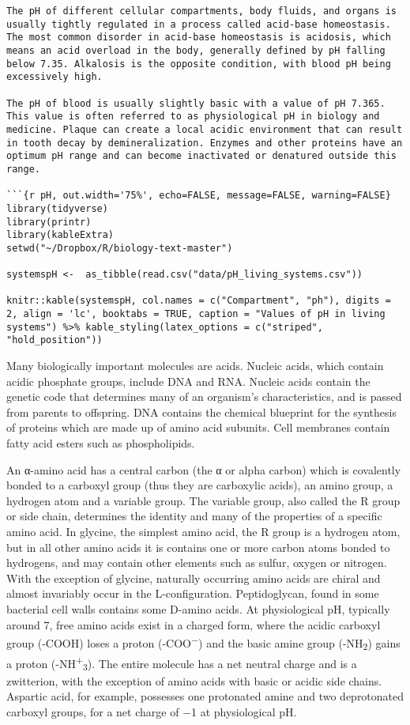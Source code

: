 \documentclass[
]{article}
\begin{document}
\begin{verbatim}
The pH of different cellular compartments, body fluids, and organs is usually tightly regulated in a process called acid-base homeostasis. The most common disorder in acid-base homeostasis is acidosis, which means an acid overload in the body, generally defined by pH falling below 7.35. Alkalosis is the opposite condition, with blood pH being excessively high.

The pH of blood is usually slightly basic with a value of pH 7.365. This value is often referred to as physiological pH in biology and medicine. Plaque can create a local acidic environment that can result in tooth decay by demineralization. Enzymes and other proteins have an optimum pH range and can become inactivated or denatured outside this range.

```{r pH, out.width='75%', echo=FALSE, message=FALSE, warning=FALSE}
library(tidyverse)
library(printr)        
library(kableExtra)
setwd("~/Dropbox/R/biology-text-master")

systemspH <-  as_tibble(read.csv("data/pH_living_systems.csv"))

knitr::kable(systemspH, col.names = c("Compartment", "ph"), digits = 2, align = 'lc', booktabs = TRUE, caption = "Values of pH in living systems") %>% kable_styling(latex_options = c("striped", "hold_position"))
\end{verbatim}

Many biologically important molecules are acids. Nucleic acids, which
contain acidic phosphate groups, include DNA and RNA. Nucleic acids
contain the genetic code that determines many of an organism's
characteristics, and is passed from parents to offspring. DNA contains
the chemical blueprint for the synthesis of proteins which are made up
of amino acid subunits. Cell membranes contain fatty acid esters such as
phospholipids.

An α-amino acid has a central carbon (the α or alpha carbon) which is
covalently bonded to a carboxyl group (thus they are carboxylic acids),
an amino group, a hydrogen atom and a variable group. The variable
group, also called the R group or side chain, determines the identity
and many of the properties of a specific amino acid. In glycine, the
simplest amino acid, the R group is a hydrogen atom, but in all other
amino acids it is contains one or more carbon atoms bonded to hydrogens,
and may contain other elements such as sulfur, oxygen or nitrogen. With
the exception of glycine, naturally occurring amino acids are chiral and
almost invariably occur in the L-configuration. Peptidoglycan, found in
some bacterial cell walls contains some D-amino acids. At physiological
pH, typically around 7, free amino acids exist in a charged form, where
the acidic carboxyl group (-COOH) loses a proton
(-COO\textsuperscript{−}) and the basic amine group
(-NH\textsubscript{2}) gains a proton
(-NH\textsuperscript{+}\textsubscript{3}). The entire molecule has a net
neutral charge and is a zwitterion, with the exception of amino acids
with basic or acidic side chains. Aspartic acid, for example, possesses
one protonated amine and two deprotonated carboxyl groups, for a net
charge of −1 at physiological pH.
\end{document}
